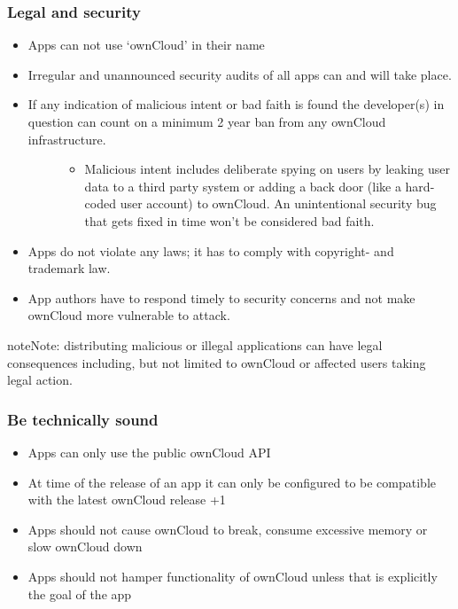 \documentclass[letterpaper,10pt,english]{sphinxmanual}
\begin{document}
\subsubsection{Legal and security}
\label{app/publishing:legal-and-security}\begin{itemize}
\item {} 
Apps can not use `ownCloud' in their name

\item {} 
Irregular and unannounced security audits of all apps can and will take place.

\item {} \begin{description}
\item[{If any indication of malicious intent or bad faith is found the developer(s) in question can count on a minimum 2 year ban from any ownCloud infrastructure.}] \leavevmode\begin{itemize}
\item {} 
Malicious intent includes deliberate spying on users by leaking user data to a third party system or adding a back door (like a hard-coded user account) to ownCloud. An unintentional security bug that gets fixed in time won't be considered bad faith.

\end{itemize}

\end{description}

\item {} 
Apps do not violate any laws; it has to comply with copyright- and trademark law.

\item {} 
App authors have to respond timely to security concerns and not make ownCloud more vulnerable to attack.

\end{itemize}

\begin{notice}{note}{Note:}
distributing malicious or illegal applications can have legal consequences including, but not limited to ownCloud or affected users taking legal action.
\end{notice}


\subsubsection{Be technically sound}
\label{app/publishing:be-technically-sound}\begin{itemize}
\item {} 
Apps can only use the public ownCloud API

\item {} 
At time of the release of an app it can only be configured to be compatible with the latest ownCloud release +1

\item {} 
Apps should not cause ownCloud to break, consume excessive memory or slow ownCloud down

\item {} 
Apps should not hamper functionality of ownCloud unless that is explicitly the goal of the app

\end{itemize}
\end{document}
